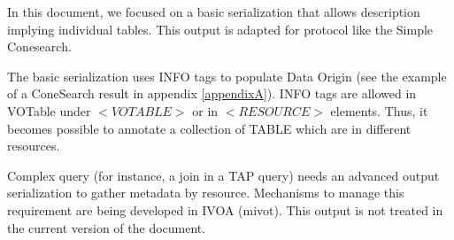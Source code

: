 \documentclass[11pt,a4paper]{ivoa}
\begin{document}
In this document, we focused on a basic serialization that allows description implying individual tables.
This output is adapted for protocol like the Simple Conesearch.

The basic serialization uses INFO tags to populate Data Origin (see the example of a ConeSearch result in appendix  \ref{appendixA}).
INFO tags are allowed in VOTable under $<VOTABLE>$ or in $<RESOURCE>$ elements.
Thus, it becomes possible to annotate a collection of TABLE which are in different resources.


Complex query (for instance, a join in a TAP query) needs an advanced output serialization to gather metadata by resource. 
Mechanisms to manage this requirement are being developed in IVOA (mivot). 
This output is not treated in the current version of the document. 



%
%
%
%
%
\end{document}
